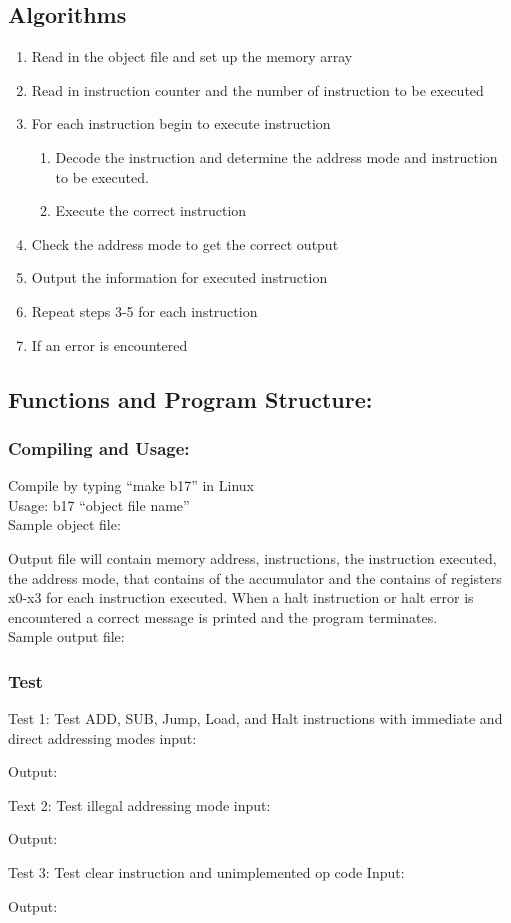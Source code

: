 \documentclass[11pt]{article}
\begin{document}
\subsection{Algorithms}
\begin{enumerate}
\item Read in the object file and set up the memory array
\item Read in instruction counter and the number of instruction to be executed
\item For each instruction  begin to execute instruction
\begin{enumerate}\item Decode the instruction and determine the address mode and instruction to be executed.
\item Execute the correct instruction \end{enumerate}
\item Check the address mode to get the correct output
\item Output the information for executed instruction 
\item Repeat steps 3-5 for each instruction
\item If an error is encountered 
\end{enumerate}

\subsection{Functions and Program Structure:}

\subsubsection{Compiling and Usage:}
Compile by typing “make b17” in Linux\\
Usage: b17 “object file name”\\
Sample object file:

Output file will contain memory address, instructions, the instruction executed, the address mode, that contains of the accumulator and the contains of registers x0-x3 for each instruction executed. When a halt instruction or halt error is encountered a correct message is printed and the program terminates. \\
Sample output file:


\subsubsection{Test}
Test 1: Test  ADD, SUB, Jump, Load, and Halt instructions with immediate and direct addressing modes
input:

Output:

Text 2: Test illegal addressing mode
input:

Output:

Test 3: Test clear instruction and unimplemented op code
Input:

Output:

\end{document}
